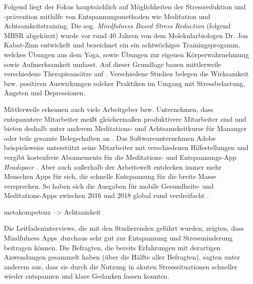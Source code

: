 Folgend liegt der Fokus hauptsächlich auf Möglichkeiten der Stressreduktion und -prävention mithilfe von Entspannungsmethoden wie Meditation und Achtsamkeitstraining.
Die sog. \textit{Mindfulness Based Stress Reduction} (folgend MBSR abgekürzt) wurde vor rund 40 Jahren von dem Molekularbiologen Dr. Jon Kabat-Zinn entwickelt und bezeichnet ein ein achtwöchiges Trainingsprogamm, welches Übungen aus dem Yoga, sowie Übungen zur eigenen Körperwahrnehmung sowie Aufmerksamkeit umfasst. Auf dieser Grundlage bauen mittlerweile verschiedene Therapieansätze auf . Verschiedene Studien belegen die Wirksamkeit bzw. positiven Auswirkungen solcher Praktiken im Umgang mit Stressbelastung, Ängsten und Depressionen.




Mittlerweile erkennen auch viele Arbeitgeber bzw. Unternehmen, dass entspanntere Mitarbeiter meißt gleichermaßen produktivere Mitarbeiter sind und bieten deshalb unter anderem Meditations- und Achtsamskeitkurse für Mananger oder teils gesamte Belegschaften an . Das Softwareunternehmen Adobe beispielsweise unterstützt seine Mitarbeiter mit verschiedenen Hilfestellungen und vergibt kostenfreie Abonnements für die Meditations- und Entspannungs-App \textit{Headspace} . 
Aber auch außerhalb der Arbeitswelt entdecken immer mehr Menschen Apps für sich, die schnelle Entspannung für die breite Masse versprechen. So haben sich die Ausgaben für mobile Gesundheits- und Meditations-Apps zwischen 2016 und 2018 global rund verdreifacht .

metakompetenz --> Achtsamkeit



 Die Leitfadeninterviews, die mit den Studierenden geführt wurden, zeigten, dass \grqq Mindfulness Apps\grqq\ durchaus sehr gut zur Entspannung und Stressminderung beitragen können. Die Befragten, die bereits Erfahrungen mit derartigen Anwendungen gesammelt haben (über die Hälfte aller Befragten), sagten unter anderem aus, dass sie durch die Nutzung in akuten Stresssituationen schneller wieder entspannen und klare Gedanken fassen konnten.